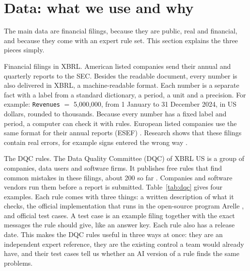 \documentclass[11pt,a4paper]{article}
\begin{document}
\section{Data: what we use and why}
\label{sec:data}

The main data are financial filings, because they are public, real and financial, and because they come with an expert rule set. This section explains the three pieces simply.

Financial filings in XBRL. American listed companies send their annual and quarterly reports to the SEC. Besides the readable document, every number is also delivered in XBRL, a machine-readable format. Each number is a separate fact with a label from a standard dictionary, a period, a unit and a precision. For example: \texttt{Revenues} $=$ 5{,}000{,}000, from 1 January to 31 December 2024, in US dollars, rounded to thousands. Because every number has a fixed label and period, a computer can check it with rules. European listed companies use the same format for their annual reports (ESEF) \cite{esef}. Research shows that these filings contain real errors, for example signs entered the wrong way \cite{debreceny}.

The DQC rules. The Data Quality Committee (DQC) of XBRL US is a group of companies, data users and software firms. It publishes free rules that find common mistakes in these filings, about 200 so far \cite{dqc}. Companies and software vendors run them before a report is submitted. Table~\ref{tab:dqc} gives four examples. Each rule comes with three things: a written description of what it checks, the official implementation that runs in the open-source program Arelle \cite{arelle}, and official test cases. A test case is an example filing together with the exact messages the rule should give, like an answer key. Each rule also has a release date. This makes the DQC rules useful in three ways at once: they are an independent expert reference, they are the existing control a team would already have, and their test cases tell us whether an AI version of a rule finds the same problems.
\end{document}
